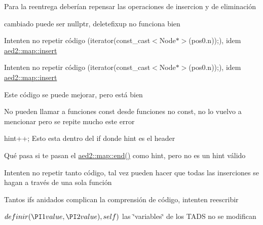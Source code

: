 \begin{DoxyRefList}
Para la reentrega deberían repensar las operaciones de insercion y de eliminación 

cambiado puede ser nullptr, deletefixup no funciona bien

Intenten no repetir código (iterator(const\+\_\+cast$<$\+Node$\ast$$>$(pos0.\+n));), idem \hyperlink{classaed2_1_1map_a6941cde9a79c27f054b5c97a587a1854_a6941cde9a79c27f054b5c97a587a1854}{aed2\+::map\+::insert} 

Intenten no repetir código (iterator(const\+\_\+cast$<$\+Node$\ast$$>$(pos0.\+n));), idem \hyperlink{classaed2_1_1map_a6941cde9a79c27f054b5c97a587a1854_a6941cde9a79c27f054b5c97a587a1854}{aed2\+::map\+::insert}  
\item[\label{deprecated__deprecated000008}%
\hypertarget{deprecated__deprecated000008}{}%
Miembro \hyperlink{classaed2_1_1map_afd0fc1a8234888e61e0e615de7e245b8_afd0fc1a8234888e61e0e615de7e245b8}{aed2\+:\+:map$<$ Key, Meaning, Compare $>$\+:\+:find} (const Key \&key)]Este código se puede mejorar, pero está bien 
\item[\label{deprecated__deprecated000009}%
\hypertarget{deprecated__deprecated000009}{}%
Miembro \hyperlink{classaed2_1_1map_ab8f3e41b1a0d7b74645836f8d2e1acfc_ab8f3e41b1a0d7b74645836f8d2e1acfc}{aed2\+:\+:map$<$ Key, Meaning, Compare $>$\+:\+:find} (const Key \&key) const ]No pueden llamar a funciones const desde funciones no const, no lo vuelvo a mencionar pero se repite mucho este error  
\item[\label{deprecated__deprecated000011}%
\hypertarget{deprecated__deprecated000011}{}%
Miembro \hyperlink{classaed2_1_1map_a6941cde9a79c27f054b5c97a587a1854_a6941cde9a79c27f054b5c97a587a1854}{aed2\+:\+:map$<$ Key, Meaning, Compare $>$\+:\+:insert} (\hyperlink{classaed2_1_1map_1_1const__iterator}{const\+\_\+iterator} hint, const value\+\_\+type \&value)]hint++; Esto esta dentro del if donde hint es el header 

Qué pasa si te pasan el \hyperlink{classaed2_1_1map_a76023e6a56cb625513e1b5ea028bf983_a76023e6a56cb625513e1b5ea028bf983}{aed2\+::map\+::end()} como hint, pero no es un hint válido 

Intenten no repetir tanto código, tal vez pueden hacer que todas las inserciones se hagan a través de una sola función 

Tantos ifs anidados complican la comprensión de código, intenten reescribir 
\item[\label{deprecated__deprecated000012}%
\hypertarget{deprecated__deprecated000012}{}%
Miembro \hyperlink{classaed2_1_1map_a2ef6723c183916276b0afc4a4c721475_a2ef6723c183916276b0afc4a4c721475}{aed2\+:\+:map$<$ Key, Meaning, Compare $>$\+:\+:insert\+\_\+or\+\_\+assign} (\hyperlink{classaed2_1_1map_1_1const__iterator}{const\+\_\+iterator} hint, const value\+\_\+type \&value)]$ definir(\PI1 value, \PI2 value), self) $ las \char`\"{}variables\char`\"{} de los T\+A\+DS no se modifican


\end{DoxyRefList}
